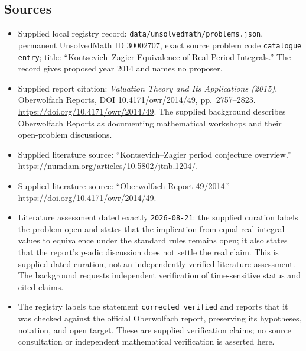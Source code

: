 \documentclass[11pt]{article}
\begin{document}
\subsection{Sources}
\begin{itemize}
\item Supplied local registry record: \texttt{data/unsolvedmath/problems.json}, permanent UnsolvedMath ID \(30002707\), exact source problem code \texttt{catalogue entry}; title: ``Kontsevich--Zagier Equivalence of Real Period Integrals.'' The record gives proposed year 2014 and names no proposer.
\item Supplied report citation: \emph{Valuation Theory and Its Applications (2015)}, Oberwolfach Reports, DOI 10.4171/owr/2014/49, pp.\ 2757--2823. \url{https://doi.org/10.4171/owr/2014/49}. The supplied background describes Oberwolfach Reports as documenting mathematical workshops and their open-problem discussions.
\item Supplied literature source: ``Kontsevich--Zagier period conjecture overview.'' \url{https://numdam.org/articles/10.5802/jtnb.1204/}.
\item Supplied literature source: ``Oberwolfach Report 49/2014.'' \url{https://doi.org/10.4171/owr/2014/49}.
\item Literature assessment dated exactly \texttt{2026-08-21}: the supplied curation labels the problem open and states that the implication from equal real integral values to equivalence under the standard rules remains open; it also states that the report's \(p\)-adic discussion does not settle the real claim. This is supplied dated curation, not an independently verified literature assessment. The background requests independent verification of time-sensitive status and cited claims.
\item The registry labels the statement \texttt{corrected\_verified} and reports that it was checked against the official Oberwolfach report, preserving its hypotheses, notation, and open target. These are supplied verification claims; no source consultation or independent mathematical verification is asserted here.
\end{itemize}
\end{document}
